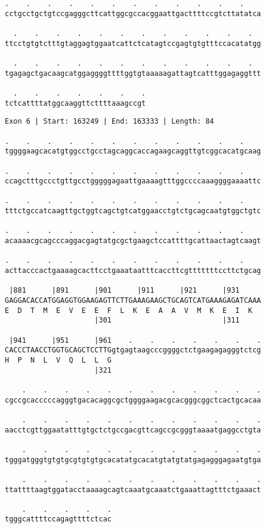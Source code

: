 \documentclass{article}
\begin{document}
\newpage
\begin{Verbatim}[fontfamily=courier]
  .    .    .    .    .    .    .    .    .    .    .    .  
cctgcctgctgtccgagggcttcattggcgccacggaattgacttttccgtcttatatca

  .    .    .    .    .    .    .    .    .    .    .    .  
ttcctgtgtctttgtaggagtggaatcattctcatagtccgagtgtgtttccacatatgg

  .    .    .    .    .    .    .    .    .    .    .    .  
tgagagctgacaagcatggaggggttttggtgtaaaaagattagtcatttggagaggttt

  .    .    .    .    .    .    .
tctcattttatggcaaggttcttttaaagccgt
\end{Verbatim}
\newpage
\begin{Verbatim}[fontfamily=courier]
Exon 6 | Start: 163249 | End: 163333 | Length: 84

.    .    .    .    .    .    .    .    .    .    .    .    
tggggaagcacatgtggcctgcctagcaggcaccagaagcaggttgtcggcacatgcaag

.    .    .    .    .    .    .    .    .    .    .    .    
ccagctttgccctgttgcctgggggagaattgaaaagtttggccccaaaggggaaaattc

.    .    .    .    .    .    .    .    .    .    .    .    
tttctgccatcaagttgctggtcagctgtcatggaacctgtctgcagcaatgtggctgtc

.    .    .    .    .    .    .    .    .    .    .    .    
acaaaacgcagcccaggacgagtatgcgctgaagctccattttgcattaactagtcaagt

.    .    .    .    .    .    .    .    .    .    .    .    
acttacccactgaaaagcacttcctgaaataatttcaccttcgtttttttccttctgcag

 |881      |891      |901      |911      |921      |931     
GAGGACACCATGGAGGTGGAAGAGTTCTTGAAAGAAGCTGCAGTCATGAAAGAGATCAAA
E  D  T  M  E  V  E  E  F  L  K  E  A  A  V  M  K  E  I  K  
                     |301                          |311     

 |941      |951      |961    .    .    .    .    .    .    .
CACCCTAACCTGGTGCAGCTCCTTGgtgagtaagcccggggctctgaagagagggtctcg
H  P  N  L  V  Q  L  L  G                                   
                     |321                                   

    .    .    .    .    .    .    .    .    .    .    .    .
cgccgcacccccagggtgacacaggcgctggggaagacgcacgggcggctcactgcacaa

    .    .    .    .    .    .    .    .    .    .    .    .
aacctcgttggaatatttgtgctctgccgacgttcagccgcgggtaaaatgaggcctgta

    .    .    .    .    .    .    .    .    .    .    .    .
tgggatgggtgtgtgcgtgtgtgcacatatgcacatgtatgtatgagagggagaatgtga

    .    .    .    .    .    .    .    .    .    .    .    .
ttattttaagtggatacctaaaagcagtcaaatgcaaatctgaaattagtttctgaaact

    .    .    .    .    .
tgggcattttccagagttttctcac
\end{Verbatim}
\end{document}
